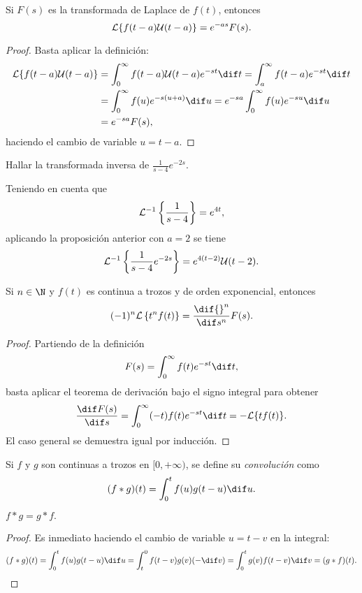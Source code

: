 \documentclass[../main.tex]{subfiles}
\begin{document}
\begin{proposition}
  Si \(F(s)\) es la transformada de Laplace de \(f(t)\), entonces
  \[\mathcal{L}\{f(t-a)\mathcal{U}(t-a)\} = e^{-as}F(s).\]
  \begin{proof}
    Basta aplicar la definición:
    \begin{align*}
      \L\{f(t-a)\mathcal{U}(t-a)\} &= \int_0^\infty f(t-a)\mathcal{U}(t-a)
      e^{-st} \dif t = \int_a^\infty f(t-a)e^{-st} \dif t \\
      &= \int_0^\infty f(u)e^{-s(u+a)} \dif u = e^{-sa} \int_0^\infty f(u)
      e^{-su} \dif u \\
      &= e^{-sa}F(s),
    \end{align*}
    haciendo el cambio de variable \(u = t-a\).
  \end{proof}
\end{proposition}

\begin{example}
  Hallar la transformada inversa de \(\frac{1}{s-4}e^{-2s}\).

  Teniendo en cuenta que
  \[\mathcal{L}^{-1}\left\{\frac{1}{s-4}\right\} = e^{4t},\]
  aplicando la proposición anterior con \(a=2\) se tiene
  \[\mathcal{L}^{-1}\left\{\frac{1}{s-4}e^{-2s}\right\} = e^{4(t-2)}\mathcal{U}(t-2).\]
\end{example}

\begin{theorem}
  Si \(n \in \N\) y \(f(t)\) es continua a trozos y de orden exponencial, entonces
  \[(-1)^n\L\left\{t^nf(t)\right\} = \frac{\dif {}^n}{\dif s^n} F(s).\]
  \begin{proof}
    Partiendo de la definición
    \[F(s) = \int_0^\infty f(t)e^{-st} \dif t,\]
    basta aplicar el teorema de derivación bajo el signo integral para obtener
    \[\frac{\dif F(s)}{\dif s} = \int_0^\infty (-t)f(t)e^{-st} \dif t =
      -\L\{tf(t)\}.\]
    El caso general se demuestra igual por inducción.
  \end{proof}
\end{theorem}

\begin{definition}
  Si \(f\) y \(g\) son continuas a trozos en \([0,+\infty)\), se define su
  \emph{convolución} como
  \[(f \ast g)(t) = \int_0^t f(u) g(t-u) \dif u.\]
\end{definition}

\begin{remark}
  \(f \ast g = g \ast f.\)
  \begin{proof}
    Es inmediato haciendo el cambio de variable \(u = t-v\) en la integral:
    \[(f \ast g)(t) = \int_0^t f(u) g(t-u) \dif u = \int_t^0 f(t-v)g(v) (-\dif
      v) = \int_0^t g(v) f(t-v) \dif v = (g \ast f)(t).\]
  \end{proof}
\end{remark}
\end{document}
